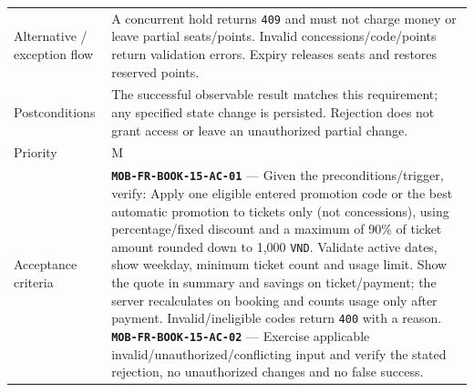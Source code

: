 \begin{longtable}{@{}P{0.23000\SRSWidth}P{0.77000\SRSWidth}@{}}
Alternative /\allowbreak{} exception flow & A concurrent hold returns \texttt{409} and must not charge money or leave partial seats/\allowbreak{}points. Invalid concessions/\allowbreak{}code/\allowbreak{}points return validation errors. Expiry releases seats and restores reserved points. \\[3pt]
Postconditions & The successful observable result matches this requirement; any specified state change is persisted. Rejection does not grant access or leave an unauthorized partial change. \\[3pt]
Priority & M \\[3pt]
Acceptance criteria & \textbf{\texttt{MOB-\allowbreak{}FR-\allowbreak{}BOOK-\allowbreak{}15-\allowbreak{}AC-\allowbreak{}01}} — Given the preconditions/\allowbreak{}trigger, verify: Apply one eligible entered promotion code or the best automatic promotion to tickets only (not concessions), using percentage/\allowbreak{}fixed discount and a maximum of 90\% of ticket amount rounded down to 1,000 \texttt{VND}. Validate active dates, show weekday, minimum ticket count and usage limit. Show the quote in summary and savings on ticket/\allowbreak{}payment; the server recalculates on booking and counts usage only after payment. Invalid/\allowbreak{}ineligible codes return \texttt{400} with a reason. \textbf{\texttt{MOB-\allowbreak{}FR-\allowbreak{}BOOK-\allowbreak{}15-\allowbreak{}AC-\allowbreak{}02}} — Exercise applicable invalid/\allowbreak{}unauthorized/\allowbreak{}conflicting input and verify the stated rejection, no unauthorized changes and no false success. \\[3pt]

\end{longtable}
